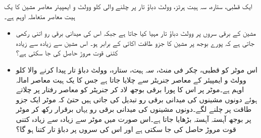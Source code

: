 ایک  قطبی، ستارہ، سہ ہیت  ہرٹز،  وولٹ دباؤ تار  پر چلنے والی  کلو وولٹ و ایمپیئر  معاصر مشین کا یک ہیت  معاصر  متعاملہ   اوہم ہے۔
\begin{itemize}
\item
مشین کے برقی سروں پر  وولٹ دباؤ تار مہیا کیا جاتا ہے جبکہ اس کی  میدانی برقی رو اتنی رکھی جاتی ہے کہ پورے بوجھ پر مشین کا جزو طاقت اکائی  کے برابر ہو۔ اس مشین سے زیادہ سے زیادہ کتنی قوت مروڑ حاصل کی جا سکتی ہے؟
\item
اس موٹر کو    قطبی،   چکر فی منٹ، سہ ہیت، ستارہ،   وولٹ دباؤ تار پیدا کرنے والا   کلو وولٹ و ایمپیئر کے معاصر جنریٹر سے چلایا جاتا ہے جس کا یک ہیت معاصر امالہ  اوہم ہے۔موٹر پر اس کا پورا برقی بوجھ لاد  کر جنریٹر کو معاصر رفتار پر چلاتے ہوئے دونوں مشینوں کی  میدانی برقی رو تبدیل کی جاتی ہیں  حتیٰ کہ موٹر ایک جزو طاقت پر چلنے لگے۔دونوں مشینوں کی میدانی برقی رو یہاں برقرار رکھ کر موٹر پر بوجھ آہستہ آہستہ بڑھایا جاتا ہے۔اس صورت میں موٹر سے زیادہ سے زیادہ کتنی قوت مروڑ  حاصل کی جا سکتی ہے اور اس کی سروں پر دباؤ تار کتنا ہو گا؟ 
\end{itemize}

